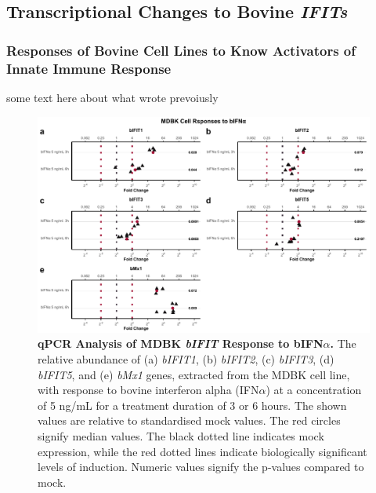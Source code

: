 \subsection{Transcriptional Changes to Bovine \textit{IFITs}} \label{Transcriptional Changes to Bovine \textit{IFITs}}
\subsubsection{Responses of Bovine Cell Lines to Know Activators of Innate Immune Response} \label{Responses of Bovine Cell Lines to Know Activators of Innate Immune Response}
some text here about what wrote prevoiusly



\begin{figure}
    \centering
    \includegraphics[width=1\linewidth]{07. Chapter 2/Figs/02. Induction/01. mdbk_treat_bifna.pdf}
    \caption[qPCR Analysis of MDBK \textit{bIFIT} Response to bIFN\(\alpha\).]{\textbf{qPCR Analysis of MDBK \textit{bIFIT} Response to bIFN\(\alpha\).} The relative abundance of (a) \textit{bIFIT1}, (b) \textit{bIFIT2}, (c) \textit{bIFIT3}, (d) \textit{bIFIT5}, and (e) \textit{bMx1} genes, extracted from the MDBK cell line, with response to bovine interferon alpha (IFN\(\alpha\)) at a concentration of 5 ng/mL for a treatment duration of 3 or 6 hours. The shown values are relative to standardised mock values. The red circles signify median values. The black dotted line indicates mock expression, while the red dotted lines indicate biologically significant levels of induction. Numeric values signify the p-values compared to mock.}
    \label{MDBK responses to bIFNa}
\end{figure}


